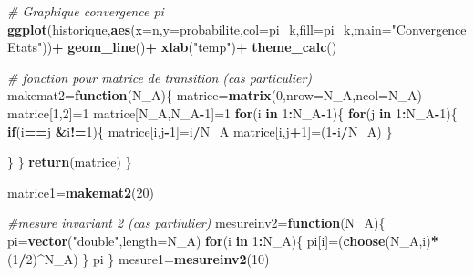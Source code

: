 \documentclass[11pt,]{article}
\newenvironment{Shaded}{\begin{snugshade}}{\end{snugshade}}
\newcommand{\KeywordTok}[1]{\textcolor[rgb]{0.13,0.29,0.53}{\textbf{#1}}}
\newcommand{\DataTypeTok}[1]{\textcolor[rgb]{0.13,0.29,0.53}{#1}}
\newcommand{\DecValTok}[1]{\textcolor[rgb]{0.00,0.00,0.81}{#1}}
\newcommand{\StringTok}[1]{\textcolor[rgb]{0.31,0.60,0.02}{#1}}
\newcommand{\CommentTok}[1]{\textcolor[rgb]{0.56,0.35,0.01}{\textit{#1}}}
\newcommand{\ControlFlowTok}[1]{\textcolor[rgb]{0.13,0.29,0.53}{\textbf{#1}}}
\newcommand{\OperatorTok}[1]{\textcolor[rgb]{0.81,0.36,0.00}{\textbf{#1}}}
\newcommand{\NormalTok}[1]{#1}
\begin{document}
\begin{Shaded}
\begin{Highlighting}[]
{{{{{{{{\CommentTok{# Graphique convergence pi}
\KeywordTok{ggplot}\NormalTok{(historique,}\KeywordTok{aes}\NormalTok{(}\DataTypeTok{x=}\NormalTok{n,}\DataTypeTok{y=}\NormalTok{probabilite,}\DataTypeTok{col=}\NormalTok{pi_k,}\DataTypeTok{fill=}\NormalTok{pi_k,}\DataTypeTok{main=}\StringTok{"Convergence Etats"}\NormalTok{))}\OperatorTok{+}
\StringTok{   }\KeywordTok{geom_line}\NormalTok{()}\OperatorTok{+}
\StringTok{ }\KeywordTok{xlab}\NormalTok{(}\StringTok{"temp"}\NormalTok{)}\OperatorTok{+}
\StringTok{  }\KeywordTok{theme_calc}\NormalTok{()}

\CommentTok{# fonction pour matrice de transition (cas particulier)}
\NormalTok{makemat2=}\ControlFlowTok{function}\NormalTok{(N_A)\{}
\NormalTok{  matrice=}\KeywordTok{matrix}\NormalTok{(}\DecValTok{0}\NormalTok{,}\DataTypeTok{nrow=}\NormalTok{N_A,}\DataTypeTok{ncol=}\NormalTok{N_A) }
\NormalTok{  matrice[}\DecValTok{1}\NormalTok{,}\DecValTok{2}\NormalTok{]=}\DecValTok{1}
\NormalTok{  matrice[N_A,N_A}\OperatorTok{-}\DecValTok{1}\NormalTok{]=}\DecValTok{1}
  \ControlFlowTok{for}\NormalTok{(i }\ControlFlowTok{in} \DecValTok{1}\OperatorTok{:}\NormalTok{N_A}\OperatorTok{-}\DecValTok{1}\NormalTok{)\{}
    \ControlFlowTok{for}\NormalTok{(j }\ControlFlowTok{in} \DecValTok{1}\OperatorTok{:}\NormalTok{N_A}\OperatorTok{-}\DecValTok{1}\NormalTok{)\{}
      \ControlFlowTok{if}\NormalTok{(i}\OperatorTok{==}\NormalTok{j }\OperatorTok{&}\NormalTok{i}\OperatorTok{!=}\DecValTok{1}\NormalTok{)\{}
\NormalTok{       matrice[i,j}\OperatorTok{-}\DecValTok{1}\NormalTok{]=i}\OperatorTok{/}\NormalTok{N_A}
\NormalTok{       matrice[i,j}\OperatorTok{+}\DecValTok{1}\NormalTok{]=(}\DecValTok{1}\OperatorTok{-}\NormalTok{i}\OperatorTok{/}\NormalTok{N_A)}
\NormalTok{      \}}
      
        
      
\NormalTok{    \}}
\NormalTok{  \}}
\KeywordTok{return}\NormalTok{(matrice)  }
\NormalTok{\}}


\NormalTok{matrice1=}\KeywordTok{makemat2}\NormalTok{(}\DecValTok{20}\NormalTok{)}


\CommentTok{#mesure invariant 2 (cas partiulier)}
\NormalTok{mesureinv2=}\ControlFlowTok{function}\NormalTok{(N_A)\{}
\NormalTok{  pi=}\KeywordTok{vector}\NormalTok{(}\StringTok{"double"}\NormalTok{,}\DataTypeTok{length=}\NormalTok{N_A)}
  \ControlFlowTok{for}\NormalTok{(i }\ControlFlowTok{in} \DecValTok{1}\OperatorTok{:}\NormalTok{N_A)\{}
\NormalTok{    pi[i]=(}\KeywordTok{choose}\NormalTok{(N_A,i)}\OperatorTok{*}\NormalTok{(}\DecValTok{1}\OperatorTok{/}\DecValTok{2}\NormalTok{)}\OperatorTok{^}\NormalTok{N_A)}
\NormalTok{  \}}
\NormalTok{  pi}
\NormalTok{\}}
\NormalTok{mesure1=}\KeywordTok{mesureinv2}\NormalTok{(}\DecValTok{10}\NormalTok{)}

}}}}}}}}
\end{Highlighting}
\end{Shaded}
\end{document}
